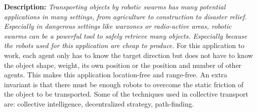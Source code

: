 
 \textbf{Description: } \emph{Transporting objects by robotic swarms has many potential applications in many settings, from agriculture to construction to disaster relief. Especially in dangerous settings like warzones or radio-active areas, robotic swarms can be a powerful tool to safely retrieve many objects. Especially because the robots used for this application are cheap to produce. }
For this application to work, each agent only has to know the target direction but does not have to know the object shape, weight, its own position or the position and number of other agents. This makes this application location-free and range-free. An extra invariant is that there must be enough robots to overcome the static friction of the object to be transported. Some of the techniques used in collective transport are: collective intelligence, decentralized strategy, path-finding. \cite{Rubenstein}
